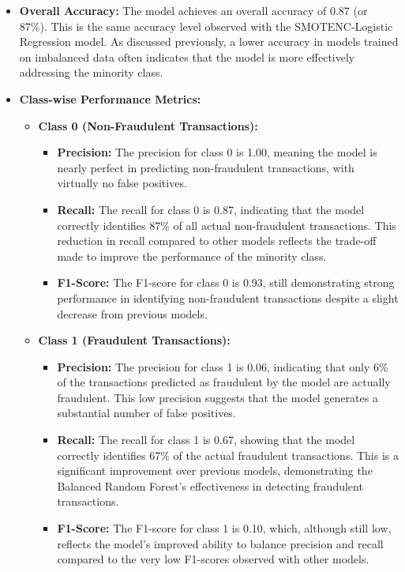 \documentclass[12pt,a4paper]{report}
\begin{document}
\begin{itemize}
    \item \textbf{Overall Accuracy:} The model achieves an overall accuracy of 0.87 (or 87\%). This is the same accuracy level observed with the SMOTENC-Logistic Regression model. As discussed previously, a lower accuracy in models trained on imbalanced data often indicates that the model is more effectively addressing the minority class.

    \item \textbf{Class-wise Performance Metrics:}
    \begin{itemize}
        \item \textbf{Class 0 (Non-Fraudulent Transactions):}
        \begin{itemize}
            \item \textbf{Precision:} The precision for class 0 is 1.00, meaning the model is nearly perfect in predicting non-fraudulent transactions, with virtually no false positives.
            \item \textbf{Recall:} The recall for class 0 is 0.87, indicating that the model correctly identifies 87\% of all actual non-fraudulent transactions. This reduction in recall compared to other models reflects the trade-off made to improve the performance of the minority class.
            \item \textbf{F1-Score:} The F1-score for class 0 is 0.93, still demonstrating strong performance in identifying non-fraudulent transactions despite a slight decrease from previous models.
        \end{itemize}
        \item \textbf{Class 1 (Fraudulent Transactions):}
        \begin{itemize}
            \item \textbf{Precision:} The precision for class 1 is 0.06, indicating that only 6\% of the transactions predicted as fraudulent by the model are actually fraudulent. This low precision suggests that the model generates a substantial number of false positives.
            \item \textbf{Recall:} The recall for class 1 is 0.67, showing that the model correctly identifies 67\% of the actual fraudulent transactions. This is a significant improvement over previous models, demonstrating the Balanced Random Forest's effectiveness in detecting fraudulent transactions.
            \item \textbf{F1-Score:} The F1-score for class 1 is 0.10, which, although still low, reflects the model's improved ability to balance precision and recall compared to the very low F1-scores observed with other models.
        \end{itemize}
    \end{itemize}


\end{itemize}
\end{document}
